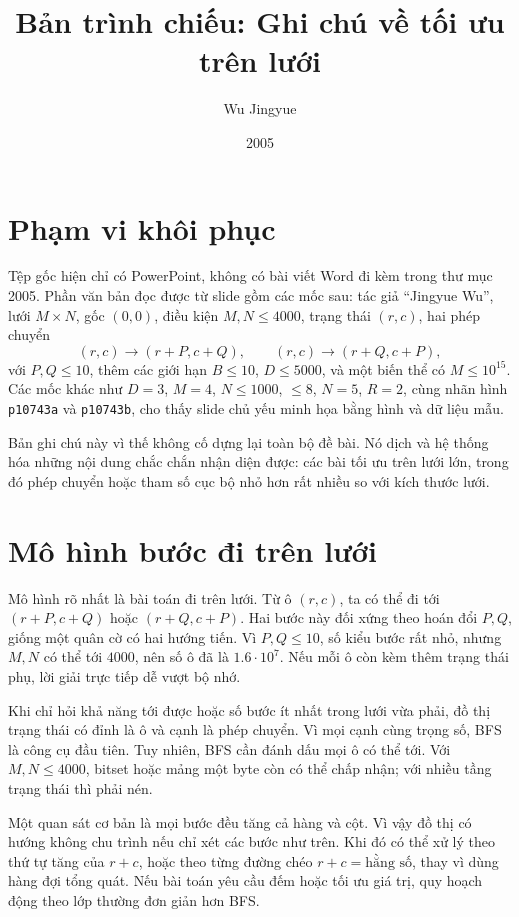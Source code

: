 \documentclass[11pt]{article}
\title{Bản trình chiếu: Ghi chú về tối ưu trên lưới}
\author{Wu Jingyue}
\date{2005}
\begin{document}
\maketitle


\section{Phạm vi khôi phục}

Tệp gốc hiện chỉ có PowerPoint, không có bài viết Word đi kèm trong thư mục
2005. Phần văn bản đọc được từ slide gồm các mốc sau: tác giả ``Jingyue Wu'',
lưới \(M\times N\), gốc \((0,0)\), điều kiện \(M,N\le 4000\), trạng thái
\((r,c)\), hai phép chuyển
\[
  (r,c)\to(r+P,c+Q),\qquad
  (r,c)\to(r+Q,c+P),
\]
với \(P,Q\le 10\), thêm các giới hạn \(B\le 10\), \(D\le 5000\), và một biến
thể có \(M\le 10^{15}\). Các mốc khác như \(D=3\), \(M=4\), \(N\le 1000\),
\(\le 8\), \(N=5\), \(R=2\), cùng nhãn hình \texttt{p10743a} và
\texttt{p10743b}, cho thấy slide chủ yếu minh họa bằng hình và dữ liệu mẫu.

Bản ghi chú này vì thế không cố dựng lại toàn bộ đề bài. Nó dịch và hệ thống
hóa những nội dung chắc chắn nhận diện được: các bài tối ưu trên lưới lớn,
trong đó phép chuyển hoặc tham số cục bộ nhỏ hơn rất nhiều so với kích thước
lưới.

\section{Mô hình bước đi trên lưới}

Mô hình rõ nhất là bài toán đi trên lưới. Từ ô \((r,c)\), ta có thể đi tới
\((r+P,c+Q)\) hoặc \((r+Q,c+P)\). Hai bước này đối xứng theo hoán đổi
\(P,Q\), giống một quân cờ có hai hướng tiến. Vì \(P,Q\le 10\), số kiểu bước
rất nhỏ, nhưng \(M,N\) có thể tới \(4000\), nên số ô đã là \(1.6\cdot 10^7\).
Nếu mỗi ô còn kèm thêm trạng thái phụ, lời giải trực tiếp dễ vượt bộ nhớ.

Khi chỉ hỏi khả năng tới được hoặc số bước ít nhất trong lưới vừa phải, đồ thị
trạng thái có đỉnh là ô và cạnh là phép chuyển. Vì mọi cạnh cùng trọng số,
BFS là công cụ đầu tiên. Tuy nhiên, BFS cần đánh dấu mọi ô có thể tới. Với
\(M,N\le 4000\), bitset hoặc mảng một byte còn có thể chấp nhận; với nhiều
tầng trạng thái thì phải nén.

Một quan sát cơ bản là mọi bước đều tăng cả hàng và cột. Vì vậy đồ thị có
hướng không chu trình nếu chỉ xét các bước như trên. Khi đó có thể xử lý theo
thứ tự tăng của \(r+c\), hoặc theo từng đường chéo \(r+c=\text{hằng số}\),
thay vì dùng hàng đợi tổng quát. Nếu bài toán yêu cầu đếm hoặc tối ưu giá trị,
quy hoạch động theo lớp thường đơn giản hơn BFS.
\end{document}
